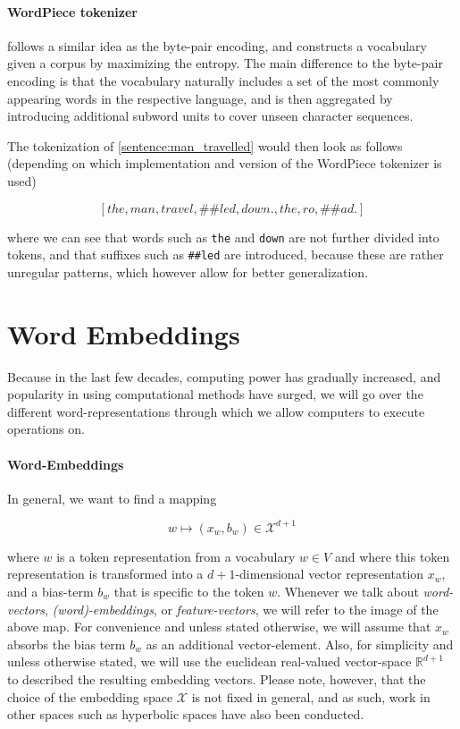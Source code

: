 \documentclass[a4paper,12pt,twoside,openright]{report}
\begin{document}
\paragraph{WordPiece tokenizer} \cite{wu16} follows a similar idea as the byte-pair encoding, and constructs a vocabulary given a corpus by maximizing the entropy.
The main difference to the byte-pair encoding is that the vocabulary naturally includes a set of the most commonly appearing words in the respective language, and is then aggregated by introducing additional subword units to cover unseen character sequences.

The tokenization of \eqref{sentence:man_travelled} would then look as follows (depending on which implementation and version of the WordPiece tokenizer is used)

$$
[the, man, travel, \#\#led, down., the, ro,  \#\#ad.]
$$

where we can see that words such as \Verb#the# and \Verb#down# are not further divided into tokens, and that suffixes such as \Verb!##led! are introduced, because these are rather unregular patterns, which however allow for better generalization.






\section{Word Embeddings}

Because in the last few decades, computing power has gradually increased, and popularity in using computational methods have surged, we will go over the different word-representations through which we allow computers to execute operations on.

\paragraph{Word-Embeddings}
In general, we want to find a mapping 

\begin{equation}
\label{map:embedding_mapping}
w \mapsto (x_w, b_w) \in \mathcal{X}^{d + 1}
\end{equation}

where $w$ is a token representation from a vocabulary $w \in V$ and where this token representation is transformed into a $d+1$-dimensional vector representation $x_w$, and a bias-term $b_w$ that is specific to the token $w$.
Whenever we talk about \textit{word-vectors}, \textit{(word)-embeddings}, or \textit{feature-vectors}, we will refer to the image of the above map. 
For convenience and unless stated otherwise, we will assume that $x_w$ absorbs the bias term $b_w$ as an additional vector-element.
Also, for simplicity and unless otherwise stated, we will use the euclidean real-valued vector-space $\mathbb{R}^{d+1}$ to described the resulting embedding vectors.
Please note, however, that the choice of the embedding space $\mathcal{X}$ is not fixed in general, and as such, work in other spaces such as hyperbolic spaces  \cite{ganea18} have also been conducted. 
\end{document}
